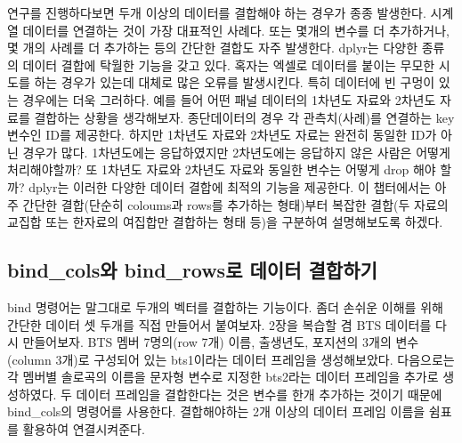 \documentclass[
]{book}
\theoremstyle{definition}
\theoremstyle{definition}
\theoremstyle{definition}
\theoremstyle{definition}
\theoremstyle{remark}
\begin{document}
연구를 진행하다보면 두개 이상의 데이터를 결합해야 하는 경우가 종종 발생한다. 시계열 데이터를 연결하는 것이 가장 대표적인 사례다. 또는 몇개의 변수를 더 추가하거나, 몇 개의 사례를 더 추가하는 등의 간단한 결합도 자주 발생한다. dplyr는 다양한 종류의 데이터 결합에 탁월한 기능을 갖고 있다. 혹자는 엑셀로 데이터를 붙이는 무모한 시도를 하는 경우가 있는데 대체로 많은 오류를 발생시킨다. 특히 데이터에 빈 구멍이 있는 경우에는 더욱 그러하다. 예를 들어 어떤 패널 데이터의 1차년도 자료와 2차년도 자료를 결합하는 상황을 생각해보자. 종단데이터의 경우 각 관측치(사례)를 연결하는 key 변수인 ID를 제공한다. 하지만 1차년도 자료와 2차년도 자료는 완전히 동일한 ID가 아닌 경우가 많다. 1차년도에는 응답하였지만 2차년도에는 응답하지 않은 사람은 어떻게 처리해야할까? 또 1차년도 자료와 2차년도 자료와 동일한 변수는 어떻게 drop 해야 할까? dplyr는 이러한 다양한 데이터 결합에 최적의 기능을 제공한다. 이 챕터에서는 아주 간단한 결합(단순히 coloums과 rows를 추가하는 형태)부터 복잡한 결합(두 자료의 교집합 또는 한자료의 여집합만 결합하는 형태 등)을 구분하여 설명해보도록 하겠다.

\hypertarget{bind_colsuxc640-bind_rowsuxb85c-uxb370uxc774uxd130-uxacb0uxd569uxd558uxae30}{%
\subsection{bind\_cols와 bind\_rows로 데이터 결합하기}\label{bind_colsuxc640-bind_rowsuxb85c-uxb370uxc774uxd130-uxacb0uxd569uxd558uxae30}}

bind 명령어는 말그대로 두개의 벡터를 결합하는 기능이다. 좀더 손쉬운 이해를 위해 간단한 데이터 셋 두개를 직접 만들어서 붙여보자. 2장을 복습할 겸 BTS 데이터를 다시 만들어보자. BTS 멤버 7명의(row 7개) 이름, 출생년도, 포지션의 3개의 변수(column 3개)로 구성되어 있는 bts1이라는 데이터 프레임을 생성해보았다. 다음으로는 각 멤버별 솔로곡의 이름을 문자형 변수로 지정한 bts2라는 데이터 프레임을 추가로 생성하였다. 두 데이터 프레임을 결합한다는 것은 변수를 한개 추가하는 것이기 때문에 bind\_cols의 명령어를 사용한다. 결합해야하는 2개 이상의 데이터 프레임 이름을 쉼표를 활용하여 연결시켜준다.
\end{document}
